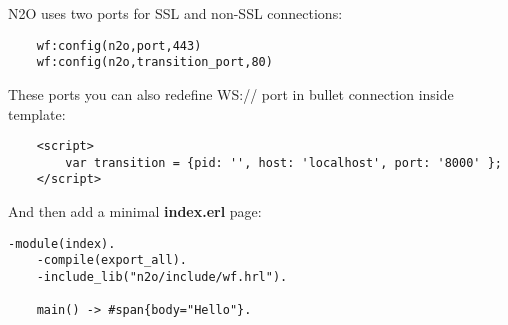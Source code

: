 N2O uses two ports for SSL and non-SSL connections: 

\begin{lstlisting}
    wf:config(n2o,port,443)
    wf:config(n2o,transition_port,80)
\end{lstlisting}

These ports you can also redefine WS:// port in bullet connection inside template:

\begin{lstlisting}
    <script>
        var transition = {pid: '', host: 'localhost', port: '8000' };
    </script>
\end{lstlisting}

And then add a minimal {\bf index.erl} page:

\begin{lstlisting}[caption=index.erl]
    -module(index).
    -compile(export_all).
    -include_lib("n2o/include/wf.hrl").

    main() -> #span{body="Hello"}.
\end{lstlisting}
